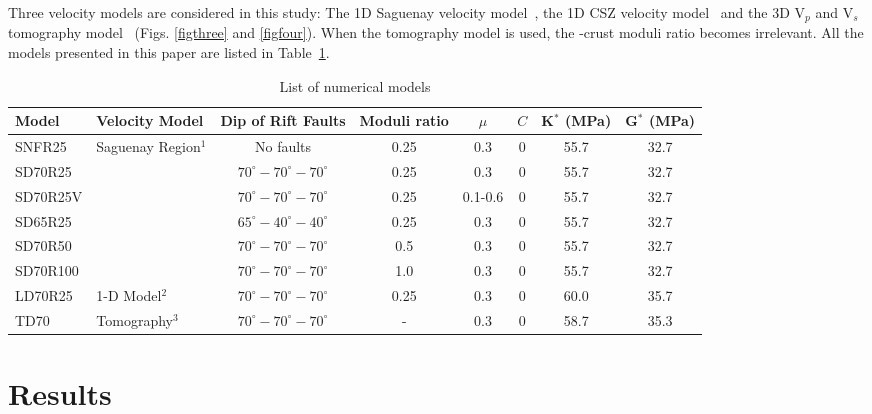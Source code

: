 \documentclass[draft]{agujournal2018}
\begin{document}
Three velocity models are considered in this study: The 1D Saguenay velocity model~\citep{Somerville1990}, the 1D CSZ velocity model~\citep{lamontagne1999} and the 3D V$_p$ and V$_s$ tomography model~\citep{Powell_2017} (Figs. \ref{figthree} and \ref{figfour}). When the tomography model is used, the -crust moduli ratio becomes irrelevant. All the models presented in this paper are listed in Table~\ref{tableone}.


\begin{table}
\caption{List of numerical models}
\centering
\begin{tabular}{llcccccc}
\hline
Model & Velocity Model & Dip of Rift Faults & Moduli ratio & $\mu$ & $C$ & K$^{*}$ (MPa) & G$^{*}$ (MPa) \\
\hline
SNFR25  & Saguenay Region$^{1}$ & No faults & 0.25 & 0.3 & 0 & 55.7 & 32.7  \\
SD70R25  &  & $70^\circ-70^\circ-70^\circ$  & 0.25 & 0.3 & 0 & 55.7 & 32.7 \\
SD70R25V  &  & $70^\circ-70^\circ-70^\circ$  & 0.25 & 0.1-0.6 & 0 & 55.7 & 32.7 \\
SD65R25  &  & $65^\circ-40^\circ-40^\circ$  & 0.25 & 0.3 & 0 & 55.7 & 32.7\\
SD70R50  &  & $70^\circ-70^\circ-70^\circ$  & 0.5 & 0.3 & 0 & 55.7 & 32.7 \\
SD70R100   &  & $70^\circ-70^\circ-70^\circ$  & 1.0 & 0.3 & 0 & 55.7 & 32.7 \\
LD70R25 & 1-D Model$^{2}$ & $70^\circ-70^\circ-70^\circ$ & 0.25 & 0.3  & 0 & 60.0 & 35.7 \\
TD70 & Tomography$^{3}$ & $70^\circ-70^\circ-70^\circ$ & - & 0.3 & 0 & 58.7 & 35.3 \\
\hline
\end{tabular}
\label{tableone}
\end{table}



\section{Results}
\end{document}

